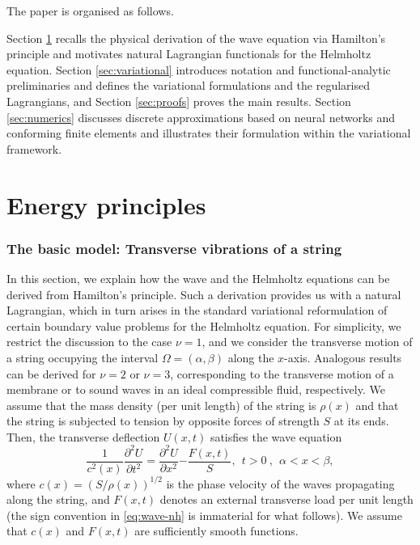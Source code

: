 \documentclass[twoside,11pt]{article}
\def\dimx{\nu }
\begin{document}
The paper is organised as follows. {Section \ref{sec:energy} recalls the physical derivation of the wave equation via Hamilton's principle and motivates   natural Lagrangian functionals for the Helmholtz equation. Section \ref{sec:variational} introduces notation and functional-analytic preliminaries and defines the variational formulations and the regularised Lagrangians, and Section \ref{sec:proofs} proves the main results. Section \ref{sec:numerics} discusses discrete approximations based on neural networks and conforming finite elements and illustrates their formulation within the variational framework.

\section{Energy principles}\label{sec:energy}
\subsubsection*{The basic model: Transverse vibrations of a string}

In this section, we explain how the wave and the Helmholtz equations can be derived from Hamilton's principle. Such a derivation provides us with a natural Lagrangian, which in turn arises in the standard variational reformulation of certain boundary value problems for the Helmholtz equation. For simplicity, we restrict the discussion to the case $\dimx = 1$, and we consider the transverse motion of a string occupying the interval {$\Omega=(\alpha,\beta)$} along the $x$-axis. Analogous results can be derived for $\dimx = 2$ or $\dimx = 3$, corresponding to the transverse motion of a membrane or to sound waves in an ideal compressible fluid, respectively.
We assume that the mass density (per unit length) of the string is $\rho(x)$ and that the string is subjected to tension by opposite forces of strength $S$ at its ends. Then, the transverse deflection $U(x,t)$ satisfies the wave equation
\begin{equation} \label{eq:wave-nh}
\frac{1}{c^2(x)}\frac{\partial^2 U}{\partial t^2}=\frac{\partial^2 U}{\partial x^2}  {- \frac{F(x,t)}{S}}, \ \  t>0\ , \ \  \alpha < x< \beta,
\end{equation}
where $c(x)= \left(S/\rho(x)\right)^{1/2}$ is the phase velocity of the waves propagating along the string, and  {$F(x,t)$ denotes an external transverse load per unit length (the sign convention in \eqref{eq:wave-nh} is immaterial for what follows)}.  {We assume that $c(x)$ and $F(x,t)$ are sufficiently smooth functions.}

}
\end{document}
